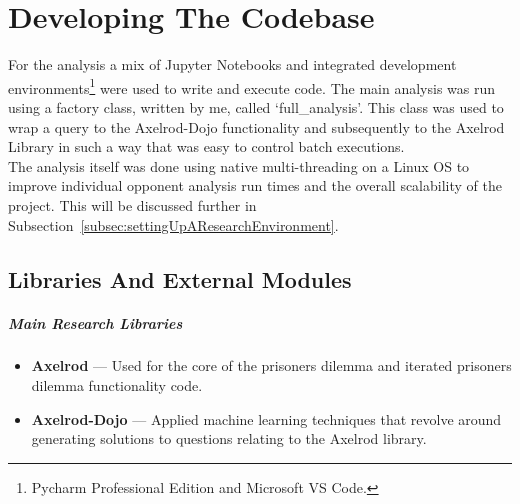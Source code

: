 \chapter{Developing The Codebase}\label{ch:developingthecodebase}
For the analysis a mix of Jupyter Notebooks and integrated development environments\footnote{Pycharm Professional Edition and Microsoft VS Code.} were used to write and execute code.
The main analysis was run using a factory class, written by me, called `full\_analysis'.
This class was used to wrap a query to the Axelrod-Dojo functionality and subsequently to the Axelrod Library in such a way that was easy to control batch executions.\\

The analysis itself was done using native multi-threading on a Linux OS to improve individual opponent analysis run times and the overall scalability of the project.
This will be discussed further in Subsection~\ref{subsec:settingUpAResearchEnvironment}.

\section{Libraries And External Modules}
\paragraph{Main Research Libraries}
\begin{itemize}
    \item \textbf{Axelrod} --- Used for the core of the prisoners dilemma and iterated prisoners dilemma functionality code.\cite{axelrodproject}
    \item \textbf{Axelrod-Dojo} --- Applied machine learning techniques that revolve around generating solutions to questions relating to the Axelrod library.
\end{itemize}

